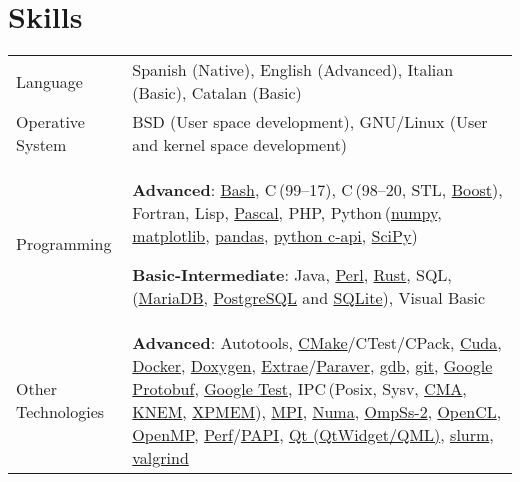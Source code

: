 \documentclass[a4paper,11pt]{article}
\def\CC{{C\nolinebreak[4]\hspace{-.05em}\raisebox{.2ex}{++}}}
\begin{document}
\section{Skills}
\begin{tabularx}{\linewidth}{@{}l X@{}}
  Language & Spanish (Native), English (Advanced), Italian (Basic), Catalan (Basic)\\
  Operative System & BSD (User space development), GNU/Linux (User and kernel space development) \\
  Programming & \textbf{Advanced}: \href{https://www.gnu.org/software/bash/}{Bash},
                C\,(99--17), \CC\,(98--20, STL, \href{https://www.boost.org/}{Boost}), Fortran, Lisp,
                \href{https://www.freepascal.org/}{Pascal}, PHP,
                Python\,(\href{https://numpy.org/}{numpy},
                \href{https://matplotlib.org/}{matplotlib},
                \href{https://pandas.pydata.org/}{pandas},
                \href{https://docs.python.org/3/c-api/index.html}{python c-api},
                \href{https://scipy.org/}{SciPy})

                \textbf{Basic-Intermediate}: Java,
                \href{https://www.perl.org/}{Perl},
                \href{https://www.rust-lang.org/}{Rust},
                SQL,
                (\href{https://mariadb.org/}{MariaDB},
                \href{https://www.postgresql.org/}{PostgreSQL} and
                \href{https://www.sqlite.org/index.html}{SQLite}), Visual Basic  \\

  Other Technologies & \textbf{Advanced}:
                       Autotools,
                       \href{https://cmake.org/}{CMake}/CTest/CPack,
                       \href{https://developer.nvidia.com/cuda-zone}{Cuda},
                       \href{https://www.docker.com/}{Docker},
                       \href{https://doxygen.nl/}{Doxygen},
                       \href{https://tools.bsc.es/extrae}{Extrae}/\href{https://tools.bsc.es/paraver}{Paraver},
                       \href{https://www.sourceware.org/gdb/}{gdb},
                       \href{https://git-scm.com/}{git},
                       \href{https://developers.google.com/protocol-buffers}{Google Protobuf},
                       \href{https://github.com/google/googletest}{Google Test},
                       IPC\,(Posix, Sysv,
                       \href{https://lwn.net/Articles/405284/}{CMA},
                       \href{https://knem.gitlabpages.inria.fr/}{KNEM},
                       \href{https://github.com/hpc/xpmem}{XPMEM}),
                       \href{https://www.mpi-forum.org/}{MPI},
                       \href{https://www.kernel.org/doc/html/v4.19/vm/numa.html}{Numa},
                       \href{https://pm.bsc.es/ompss-2}{OmpSs-2},
                       \href{https://www.khronos.org/api/opencl}{OpenCL},
                       \href{https://www.openmp.org/}{OpenMP},
                       \href{https://perf.wiki.kernel.org/index.php/Main_Page}{Perf}/\href{https://icl.utk.edu/papi/}{PAPI},
                       \href{https://www.qt.io/}{Qt (QtWidget/QML)},
                       \href{https://slurm.schedmd.com/}{slurm},
                       \href{https://valgrind.org/}{valgrind}


\end{tabularx}
\end{document}

